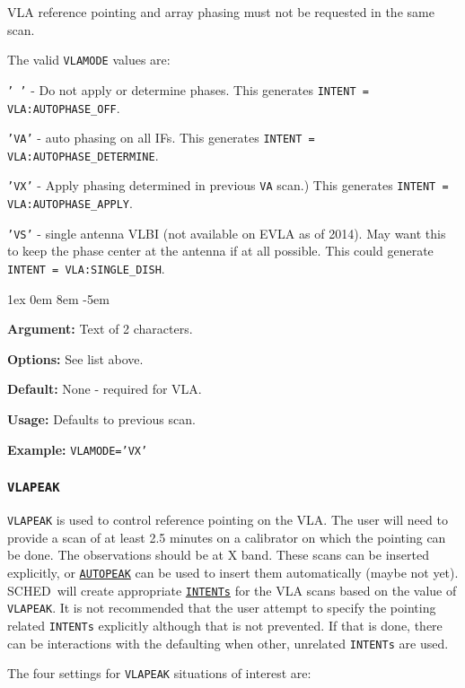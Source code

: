 \documentclass{report}
\newcommand{\schedb}{{\sc SCHED~}}
\newcommand{\rcwbox}[5]{
  \begin{list}{}{\parsep 1ex  \itemsep 0em
                 \leftmargin 8em  \itemindent -5em }
    \item {\bf Argument:} #1
    \item {\bf Options:}  #2
    \item {\bf Default:}  #3
    \item {\bf Usage:}    #4
    \item {\bf Example:}  #5
  \end{list}
}
\begin{document}
VLA reference pointing and array phasing must not be requested in the 
same scan.

The valid {\tt VLAMODE} values are:

\begin{description}

\item  {\tt '  '} - Do not apply or determine phases.
This generates {\tt INTENT = VLA:AUTOPHASE\_OFF}.

\item  {\tt 'VA'} - auto phasing on all IFs.
This generates {\tt INTENT = VLA:AUTOPHASE\_DETERMINE}.

\item  {\tt 'VX'} - Apply phasing determined in previous {\tt VA} scan.)
This generates {\tt INTENT = VLA:AUTOPHASE\_APPLY}.

\item  {\tt 'VS'} - single antenna VLBI (not available on EVLA as of 2014).
May want this to keep the phase center at the antenna if at all possible.
This could generate {\tt INTENT = VLA:SINGLE\_DISH}.


\end{description}

\rcwbox
{Text of 2 characters.}
{See list above.}
{None - required for VLA.}
{Defaults to previous scan.}
{{\tt VLAMODE='VX'}}

\subsubsection{\label{MP:VLAPEAK}{\tt VLAPEAK}}

{\tt VLAPEAK} is used to control reference pointing on the VLA.  The
user will need to provide a scan of at least 2.5 minutes on a
calibrator on which the pointing can be done.  The observations should
be at X band.  These scans can be inserted explicitly, or
{\hyperref[MP:AUTOPEAK]{{\tt AUTOPEAK}}} can be used to insert them
automatically (maybe not yet).  \schedb will create appropriate
{\hyperref[MP:INTENTs]{{\tt INTENTs}}} for the VLA scans based on the
value of {\tt VLAPEAK}.  It is not recommended that the user attempt
to specify the pointing related {\tt INTENTs} explicitly although that
is not prevented.  If that is done, there can be interactions with the
defaulting when other, unrelated {\tt INTENTs} are used.

The four settings for {\tt VLAPEAK} situations of interest are:
\end{document}
